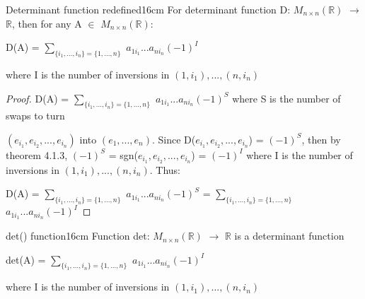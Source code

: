     \vspace{0.5cm}



    \begin{corollary}{Determinant function redefined}{16cm}
        For determinant function D: $M_{n \times n}(\mathbb{R})$
        $\rightarrow$ $\mathbb{R}$, then for any
        A $\in$ $M_{n \times n}(\mathbb{R})$:

        \hspace{0.5cm}
        D(A) = $\sum_{\{i_1,...,i_n\} = \{1,...,n\}}$
                $a_{1i_1}...a_{ni_n}(-1)^I$

        where I is the number of inversions
        in $(1,i_1),...,(n,i_n)$
    \end{corollary}

    \begin{proof}
        D(A) =
        $\sum_{\{i_1,...,i_n\} = \{1,...,n\}}$
            $a_{1i_1}...a_{ni_n}(-1)^S$
        where S is the number of swaps to turn 

        $(e_{i_1},e_{i_2},...,e_{i_n})$ into $(e_1,...,e_n)$.
        Since D($e_{i_1},e_{i_2},...,e_{i_n}$) = $(-1)^S$,
        then by {\color{red} theorem 4.1.3},
        $(-1)^S$ = sgn($e_{i_1},e_{i_2},...,e_{i_n}$) = $(-1)^I$
        where I is the number of inversions
        in $(1,i_1),...,(n,i_n)$. Thus:

        \hspace{0.5cm}
        D(A)
        = $\sum_{\{i_1,...,i_n\} = \{1,...,n\}}$
            $a_{1i_1}...a_{ni_n}(-1)^S$
        = $\sum_{\{i_1,...,i_n\} = \{1,...,n\}}$
            $a_{1i_1}...a_{ni_n}(-1)^I$
    \end{proof}

    \newpage



    \begin{wtheorem}{det() function}{16cm}
        Function det: $M_{n \times n}(\mathbb{R})$ $\rightarrow$ $\mathbb{R}$
        is a determinant function

        \hspace{0.5cm}
        det(A) = $\sum_{\{i_1,...,i_n\} = \{1,...,n\}}$
                    $a_{1i_1}...a_{ni_n}(-1)^I$
        
        where I is the number of inversions
        in $(1,i_1),...,(n,i_n)$
    \end{wtheorem}

